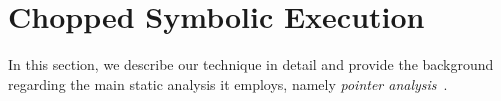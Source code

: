 
\chapter{Chopped Symbolic Execution}\label{chapter:design}

In this section, we describe our technique in detail and provide the
background regarding the main static analysis it employs,
namely \emph{pointer analysis}~\cite{andersen:pointeranalysis, Hind:Paste2001, Smaragdakis:FTPL2015}.













